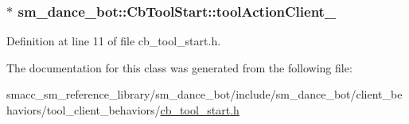 \subsubsection[{\texorpdfstring{tool\+Action\+Client\+\_\+}{toolActionClient_}}]{$\ast$ sm\+\_\+dance\+\_\+bot\+::\+Cb\+Tool\+Start\+::tool\+Action\+Client\+\_\+}\hypertarget{classsm__dance__bot_1_1CbToolStart_af0d815c686d7f5cc6d16c3f8ec2443c4}{}\label{classsm__dance__bot_1_1CbToolStart_af0d815c686d7f5cc6d16c3f8ec2443c4}


Definition at line 11 of file cb\+\_\+tool\+\_\+start.\+h.



The documentation for this class was generated from the following file\+:\begin{DoxyCompactItemize}
\item 
smacc\+\_\+sm\+\_\+reference\+\_\+library/sm\+\_\+dance\+\_\+bot/include/sm\+\_\+dance\+\_\+bot/client\+\_\+behaviors/tool\+\_\+client\+\_\+behaviors/\hyperlink{cb__tool__start_8h}{cb\+\_\+tool\+\_\+start.\+h}\end{DoxyCompactItemize}
